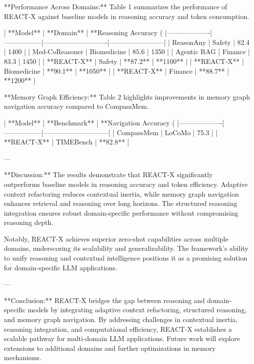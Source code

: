 **Performance Across Domains:**  
Table 1 summarizes the performance of REACT-X against baseline models in reasoning accuracy and token consumption.  

| **Model**        | **Domain**      | **Reasoning Accuracy (%
|-------------------|-----------------|----------------------------|------------------------|  
| ReasonAny         | Safety          | 82.4                      | 1400                  |  
| Med-CoReasoner    | Biomedicine     | 85.6                      | 1350                  |  
| Agentic RAG       | Finance         | 83.3                      | 1450                  |  
| **REACT-X**       | Safety          | **87.2**                  | **1100**              |  
| **REACT-X**       | Biomedicine     | **90.1**                  | **1050**              |  
| **REACT-X**       | Finance         | **88.7**                  | **1200**              |  

**Memory Graph Efficiency:**  
Table 2 highlights improvements in memory graph navigation accuracy compared to CompassMem.  

| **Model**        | **Benchmark**   | **Navigation Accuracy (%
|-------------------|-----------------|-----------------------------|  
| CompassMem        | LoCoMo          | 75.3                        |  
| **REACT-X**       | TIMEBench       | **82.8**                    |  

---

**Discussion:**  
The results demonstrate that REACT-X significantly outperforms baseline models in reasoning accuracy and token efficiency. Adaptive context refactoring reduces contextual inertia, while memory graph navigation enhances retrieval and reasoning over long horizons. The structured reasoning integration ensures robust domain-specific performance without compromising reasoning depth.  

Notably, REACT-X achieves superior zero-shot capabilities across multiple domains, underscoring its scalability and generalizability. The framework's ability to unify reasoning and contextual intelligence positions it as a promising solution for domain-specific LLM applications.  

---

**Conclusion:**  
REACT-X bridges the gap between reasoning and domain-specific models by integrating adaptive context refactoring, structured reasoning, and memory graph navigation. By addressing challenges in contextual inertia, reasoning integration, and computational efficiency, REACT-X establishes a scalable pathway for multi-domain LLM applications. Future work will explore extensions to additional domains and further optimizations in memory mechanisms.  

